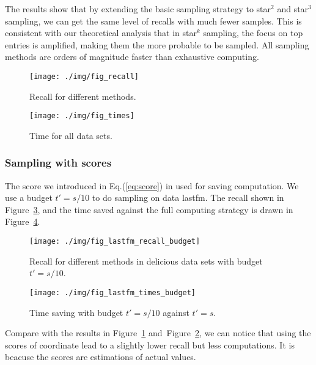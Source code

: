 \documentclass[letterpaper]{article}
\newcommand{\Eqn}[1]{Eq.(\ref{eq:#1})}
\newcommand{\Fig}[1]{Figure~\ref{fig:#1}}
\begin{document}
The results show that by extending the basic sampling strategy to star$^2$ and star$^3$ sampling,
we can get the same level of recalls with much fewer samples.
This is consistent with our theoretical analysis that in star$^k$ sampling,
the focus on top entries is amplified, 
making them the more probable to be sampled. 
All sampling methods are orders of magnitude faster than exhaustive computing.
\begin{figure}[]
  \centering
  \texttt{[image: ./img/fig\_recall]}\\
  \caption{Recall for different methods.}
  \label{fig:recall}
\end{figure}
\begin{figure}[]
  \centering
  \texttt{[image: ./img/fig\_times]}\\
  \caption{Time for all data sets.}
  \label{fig:time}
\end{figure}

\subsubsection{Sampling with scores}
The score we introduced in \Eqn{score} in used for saving computation.
We use a budget $t' = s/10$ to do sampling on data lastfm.
The recall shown in \Fig{budget}, and the time saved against the full computing strategy is drawn in \Fig{time_budget}.
\begin{figure}[]
  \centering
  \texttt{[image: ./img/fig\_lastfm\_recall\_budget]}\\
  \caption{Recall for different methods in delicious data sets with budget $t'=s/10$.}
  \label{fig:budget}
\end{figure}
\begin{figure}[]
  \centering
  \texttt{[image: ./img/fig\_lastfm\_times\_budget]}\\
  \caption{Time saving with budget $t'=s/10$ against $t'=s$.}
  \label{fig:time_budget}
\end{figure}
Compare with the results in \Fig{recall} and~\Fig{time},
we can notice that using the scores of coordinate 
lead to a slightly lower recall but less computations.
It is beacuse the scores are estimations of actual values.
\end{document}
